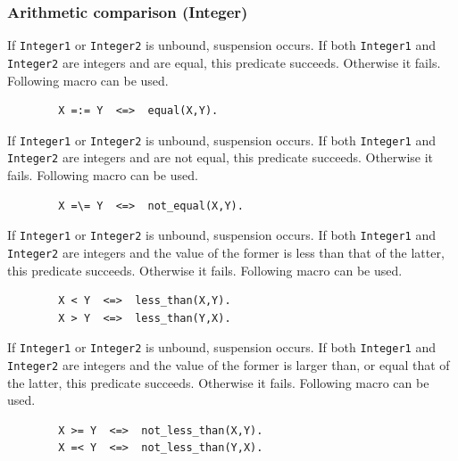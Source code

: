 \subsubsection{Arithmetic comparison (Integer)}
\begin{itemize}

If \verb|Integer1| or \verb|Integer2| is unbound, suspension occurs.
If both \verb|Integer1| and \verb|Integer2| are integers and are equal,
this predicate succeeds. Otherwise it fails. Following macro can be used.
\begin{verbatim}
        X =:= Y  <=>  equal(X,Y).
\end{verbatim}

\index{\verb|=:=|}
If \verb|Integer1| or \verb|Integer2| is unbound, suspension occurs.
If both \verb|Integer1| and \verb|Integer2| are integers and are not equal,
this predicate succeeds. Otherwise it fails. Following macro can be used.
\begin{verbatim}
        X =\= Y  <=>  not_equal(X,Y).
\end{verbatim}

\index{\verb|=\=|}
If \verb|Integer1| or \verb|Integer2| is unbound, suspension occurs.
If both \verb|Integer1| and \verb|Integer2| are integers 
and the value of the former is less than that of the latter,
this predicate succeeds. Otherwise it fails. Following macro can be used.
\begin{verbatim}
        X < Y  <=>  less_than(X,Y).
        X > Y  <=>  less_than(Y,X).
\end{verbatim}

\index{\verb|<|} \index{\verb|>|}
If \verb|Integer1| or \verb|Integer2| is unbound, suspension occurs.
If both \verb|Integer1| and \verb|Integer2| are integers 
and the value of the former is larger than, or equal that of the latter,
this predicate succeeds. Otherwise it fails. Following macro can be used.
\begin{verbatim}
        X >= Y  <=>  not_less_than(X,Y).
        X =< Y  <=>  not_less_than(Y,X).
\end{verbatim}

\index{\verb|>=|} \index{\verb|=<|}
\end{itemize}
